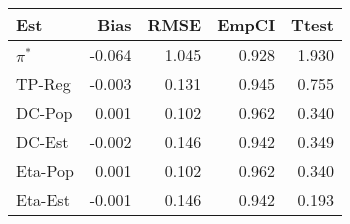 
\begin{tabular}{lrrrr}
\toprule
Est & Bias & RMSE & EmpCI & Ttest\\
\midrule
$\pi^*$ & -0.064 & 1.045 & 0.928 & 1.930\\
TP-Reg & -0.003 & 0.131 & 0.945 & 0.755\\
DC-Pop & 0.001 & 0.102 & 0.962 & 0.340\\
DC-Est & -0.002 & 0.146 & 0.942 & 0.349\\
Eta-Pop & 0.001 & 0.102 & 0.962 & 0.340\\
\addlinespace
Eta-Est & -0.001 & 0.146 & 0.942 & 0.193\\
\bottomrule
\end{tabular}
